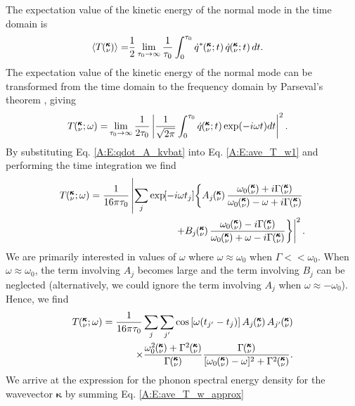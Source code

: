 The expectation value of the kinetic energy of the normal mode in the time 
domain is
\begin{equation}\label{A:E:ave_T_t}
\begin{split}
\langle T\kv \rangle=&\frac{1}{2}\lim_{\tau_0\rightarrow\infty}
\frac{1}{\tau_0}\int_{0}^{\tau_0}\dot{q}^*\kvt\dot{q}\kvt dt.
\end{split}
\end{equation}
The expectation value of the kinetic energy of the normal mode can 
be transformed from the time domain to the
frequency domain by Parseval's theorem \cite{rudin_real_1987}, giving
\begin{equation}\label{A:E:ave_T_w1}
\begin{split}
T\mspace{-4.0mu}\left(\mspace{-8.0mu} \begin{smallmatrix}&\pmb{\kappa} \\&\nu\end{smallmatrix} \mspace{-2.0mu};\omega\right)=&\lim_{\tau_0\rightarrow\infty}\frac{1}{2\tau_0}
\left|\frac{1}{\sqrt{2\pi}}\int_{0}^{\tau_0}\dot{q}\mspace{-4.0mu}\left(\mspace{-8.0mu} \begin{smallmatrix}&\pmb{\kappa} \\&\nu\end{smallmatrix} \mspace{-2.0mu};t\right)
\exp(-i\omega t)dt\right|^2.
\end{split}
\end{equation}
By substituting Eq$.$ \eqref{A:E:qdot_A_kvbat} into Eq$.$ 
\eqref{A:E:ave_T_w1} and performing the time integration we find
\begin{equation}\label{A:E:ave_T_w_int}
\begin{split}
T\kvw = \frac{1}{16\pi\tau_0}\left|\sum_j\EXP{-i\omega t_j} 
\left\{A_j\kv\frac{\omega_0\kv+i\Gamma\kv}{\omega_0\kv-\omega+i\Gamma\kv}
\right.\right.\\
\left.\left.+B_j\kv\frac{\omega_0\kv-i\Gamma\kv}
{\omega_0\kv+\omega-i\Gamma\kv}\right\}\right|^2.
\end{split}
\end{equation}
We are primarily interested in values of $\omega$ where 
$\omega\approx\omega_0$ when $\Gamma<<\omega_0$.  
When $\omega\approx\omega_0$, 
the term involving $A_j$ becomes large and the term involving $B_j$ can 
be neglected (alternatively, we could ignore the term involving $A_j$ 
when $\omega\approx-\omega_0$).  Hence, we find
\begin{equation}\label{A:E:ave_T_w_approx}
\begin{split}
T\kvw=\frac{1}{16\pi\tau_0}\sum_j\sum_{j'}\cos\left[\omega (t_{j'}-t_j)
\right]A_j\kv A_{j'}\kv\\
\times\frac{\omega_0^2\kv+\Gamma^2\kv}{\Gamma\kv}\frac{\Gamma\kv}
{[\omega_0\kv-\omega]^2+\Gamma^2\kv}.
\end{split}
\end{equation}
We arrive at the expression for the phonon spectral energy density for the 
wavevector $\pmb{\kappa}$ by summing Eq$.$ \eqref{A:E:ave_T_w_approx} 
